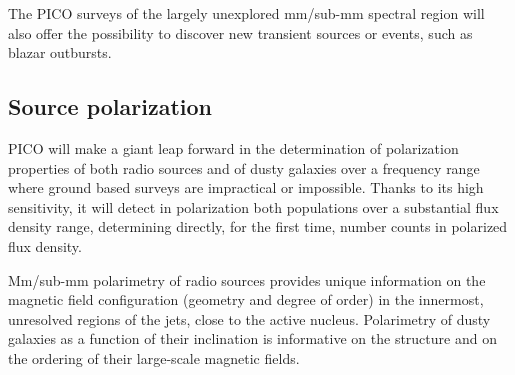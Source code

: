 \documentclass[11pt,a4paper]{article}
\begin{document}
The PICO surveys of the largely unexplored mm/sub-mm spectral region will also offer the possibility to discover new transient sources \cite{Metzger2015} or events, such as blazar outbursts.


\subsection{Source polarization}

PICO will make a giant leap forward in the determination of
polarization properties of both radio sources and of dusty galaxies over a
frequency range where ground based surveys are impractical or impossible.
Thanks to its high sensitivity, it will detect in polarization both populations over a substantial flux density range, determining directly, for the first time, number counts in polarized flux density.

Mm/sub-mm polarimetry of radio sources provides unique information on the magnetic field configuration (geometry and degree of order) in the innermost, unresolved regions of the jets, close to the active nucleus. Polarimetry of dusty galaxies as a function of their inclination is informative on the structure and on the ordering of their large-scale magnetic fields.



\newpage




\end{document}

